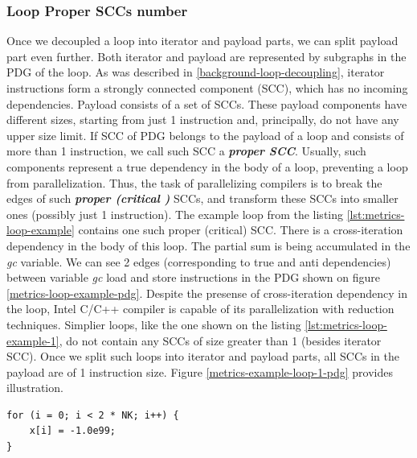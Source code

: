 \subsubsection{Loop Proper SCCs number}
\label{metrics-loop-proper-sccs-number}
\qquad Once we decoupled a loop into iterator and payload parts, we can split payload part even further. Both iterator and payload are represented by subgraphs in the PDG of the loop. As was described in \ref{background-loop-decoupling}, iterator instructions form a strongly connected component (SCC), which has no incoming dependencies. Payload consists of a set of SCCs. These payload components have different sizes, starting from just 1 instruction and, principally, do not have any upper size limit. If SCC of PDG belongs to the payload of a loop and consists of more than 1 instruction, we call such SCC a \textbf{\textit{proper SCC}}. Usually, such components represent a true dependency in the body of a loop, preventing a loop from parallelization. Thus, the task of parallelizing compilers is to break the edges of such \textbf{\textit{proper (critical )}} SCCs, and transform these SCCs into smaller ones (possibly just 1 instruction). \newline
\null\qquad The example loop from the listing \ref{lst:metrics-loop-example} contains one such proper (critical) SCC. There is a cross-iteration dependency in the body of this loop. The partial sum is being accumulated in the \textit{gc} variable. We can see 2 edges (corresponding to true and anti dependencies) between variable \textit{gc} load and store instructions in the PDG shown on figure \ref{metrics-loop-example-pdg}. Despite the presense of cross-iteration dependency in the loop, Intel C/C++ compiler is capable of its parallelization with reduction techniques.\newline
\null\qquad Simplier loops, like the one shown on the listing \ref{lst:metrics-loop-example-1}, do not contain any SCCs of size greater than 1 (besides iterator SCC). Once we split such loops into iterator and payload parts, all SCCs in the payload are of 1 instruction size. Figure \ref{metrics-example-loop-1-pdg} provides illustration.
  
\begin{lstlisting}[float,floatplacement=H,caption={Parallelizible loop, with no cross-iteration dependencies. Taken from EP NAS benchmark.}, captionpos=b, label=lst:metrics-loop-example-1]
for (i = 0; i < 2 * NK; i++) {
	x[i] = -1.0e99;
}
\end{lstlisting}

